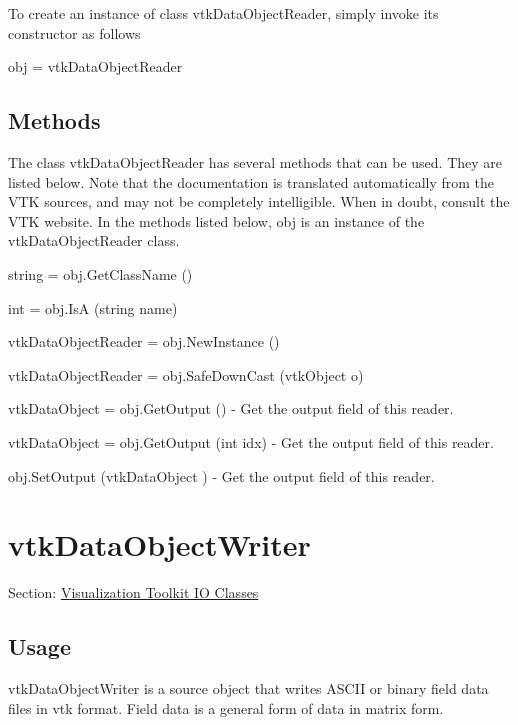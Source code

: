 To create an instance of class vtk\-Data\-Object\-Reader, simply invoke its constructor as follows \begin{DoxyVerb}  obj = vtkDataObjectReader
\end{DoxyVerb}
 \hypertarget{vtkwidgets_vtkxyplotwidget_Methods}{}\subsection{Methods}\label{vtkwidgets_vtkxyplotwidget_Methods}
The class vtk\-Data\-Object\-Reader has several methods that can be used. They are listed below. Note that the documentation is translated automatically from the V\-T\-K sources, and may not be completely intelligible. When in doubt, consult the V\-T\-K website. In the methods listed below, {\ttfamily obj} is an instance of the vtk\-Data\-Object\-Reader class. 
\begin{DoxyItemize}
\item {\ttfamily string = obj.\-Get\-Class\-Name ()}  
\item {\ttfamily int = obj.\-Is\-A (string name)}  
\item {\ttfamily vtk\-Data\-Object\-Reader = obj.\-New\-Instance ()}  
\item {\ttfamily vtk\-Data\-Object\-Reader = obj.\-Safe\-Down\-Cast (vtk\-Object o)}  
\item {\ttfamily vtk\-Data\-Object = obj.\-Get\-Output ()} -\/ Get the output field of this reader.  
\item {\ttfamily vtk\-Data\-Object = obj.\-Get\-Output (int idx)} -\/ Get the output field of this reader.  
\item {\ttfamily obj.\-Set\-Output (vtk\-Data\-Object )} -\/ Get the output field of this reader.  
\end{DoxyItemize}\hypertarget{vtkio_vtkdataobjectwriter}{}\section{vtk\-Data\-Object\-Writer}\label{vtkio_vtkdataobjectwriter}
Section\-: \hyperlink{sec_vtkio}{Visualization Toolkit I\-O Classes} \hypertarget{vtkwidgets_vtkxyplotwidget_Usage}{}\subsection{Usage}\label{vtkwidgets_vtkxyplotwidget_Usage}
vtk\-Data\-Object\-Writer is a source object that writes A\-S\-C\-I\-I or binary field data files in vtk format. Field data is a general form of data in matrix form.

